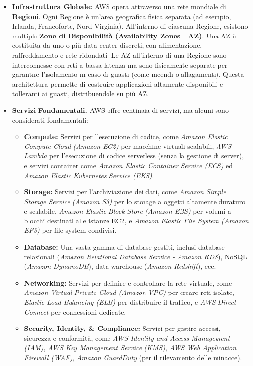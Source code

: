 \begin{itemize}
    \item \textbf{Infrastruttura Globale:} AWS opera attraverso una rete mondiale di \textbf{Regioni}. Ogni Regione è un'area geografica fisica separata (ad esempio, Irlanda, Francoforte, Nord Virginia). All'interno di ciascuna Regione, esistono multiple \textbf{Zone di Disponibilità (Availability Zones - AZ)}. Una AZ è costituita da uno o più data center discreti, con alimentazione, raffreddamento e rete ridondati. Le AZ all'interno di una Regione sono interconnesse con reti a bassa latenza ma sono fisicamente separate per garantire l'isolamento in caso di guasti (come incendi o allagamenti). Questa architettura permette di costruire applicazioni altamente disponibili e tolleranti ai guasti, distribuendole su più AZ.
    \item \textbf{Servizi Fondamentali:} AWS offre centinaia di servizi, ma alcuni sono considerati fondamentali:
        \begin{itemize}
            \item \textbf{Compute:} Servizi per l'esecuzione di codice, come \textit{Amazon Elastic Compute Cloud (Amazon EC2)} per macchine virtuali scalabili, \textit{AWS Lambda} per l'esecuzione di codice serverless (senza la gestione di server), e servizi container come \textit{Amazon Elastic Container Service (ECS)} ed \textit{Amazon Elastic Kubernetes Service (EKS)}.
            \item \textbf{Storage:} Servizi per l'archiviazione dei dati, come \textit{Amazon Simple Storage Service (Amazon S3)} per lo storage a oggetti altamente duraturo e scalabile, \textit{Amazon Elastic Block Store (Amazon EBS)} per volumi a blocchi destinati alle istanze EC2, e \textit{Amazon Elastic File System (Amazon EFS)} per file system condivisi.
            \item \textbf{Database:} Una vasta gamma di database gestiti, inclusi database relazionali (\textit{Amazon Relational Database Service - Amazon RDS}), NoSQL (\textit{Amazon DynamoDB}), data warehouse (\textit{Amazon Redshift}), ecc.
            \item \textbf{Networking:} Servizi per definire e controllare la rete virtuale, come \textit{Amazon Virtual Private Cloud (Amazon VPC)} per creare reti isolate, \textit{Elastic Load Balancing (ELB)} per distribuire il traffico, e \textit{AWS Direct Connect} per connessioni dedicate.
            \item \textbf{Security, Identity, \& Compliance:} Servizi per gestire accessi, sicurezza e conformità, come \textit{AWS Identity and Access Management (IAM)}, \textit{AWS Key Management Service (KMS)}, \textit{AWS Web Application Firewall (WAF)}, \textit{Amazon GuardDuty} (per il rilevamento delle minacce).

\end{itemize}
\end{itemize}
